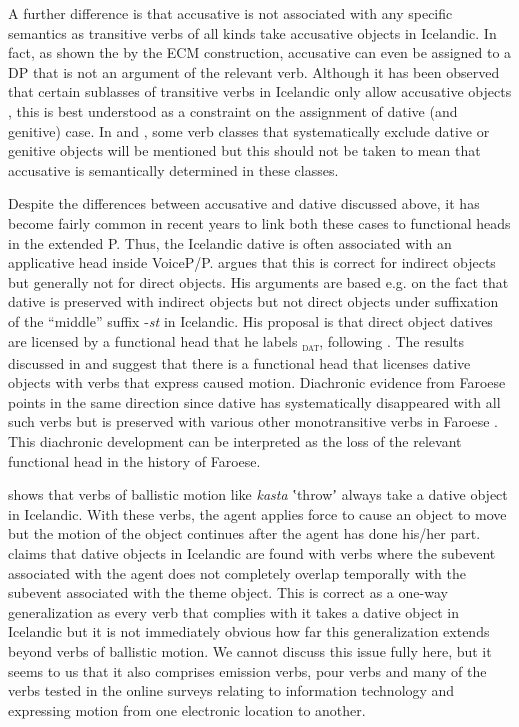 \documentclass[output=paper,modfonts,nonflat,colorlinks,citecolor=brown]{langsci/langscibook}
\begin{document}
A further difference is that accusative is not associated with any specific semantics as transitive verbs of all kinds take accusative objects in Icelandic. In fact, as shown the by the ECM construction, accusative can even be assigned to a DP that is not an argument of the relevant verb. Although it has been observed that certain sublasses of transitive verbs in Icelandic only allow accusative objects \citep{Jónsson2013a}, this is best understood as a constraint on the assignment of dative (and genitive) case. In  and , some verb classes that systematically exclude dative or genitive objects will be mentioned but this should not be taken to mean that accusative is semantically determined in these classes.

Despite the differences between accusative and dative discussed above, it has become fairly common in recent years to link both these cases to functional heads in the extended \liv P. Thus, the Icelandic dative is often associated with an applicative head inside VoiceP/\liv P. \citet[128--138]{Wood2015} argues that this is correct for indirect objects but generally not for direct objects. His arguments are based e.g. on the fact that dative is preserved with indirect objects but not direct objects under suffixation of the “middle” suffix -\textit{st} in Icelandic. His proposal is that direct object datives are licensed by a functional head that he labels \liv\textsc{\textsubscript{dat}}, following \citet{Svenonius2006alternations}. The results discussed in  and  suggest that there is a functional head that licenses dative objects with verbs that express caused motion. Diachronic evidence from Faroese points in the same direction since dative has systematically disappeared with all such verbs but is preserved with various other monotransitive verbs in Faroese \citep{Jónsson2009}. This diachronic development can be interpreted as the loss of the relevant functional head in the history of Faroese.

\citet{Svenonius2002} shows that verbs of ballistic motion like \textit{kasta} ʽthrowʼ always take a dative object in Icelandic. With these verbs, the agent applies force to cause an object to move but the motion of the object continues after the agent has done his/her part. \citet{Svenonius2002} claims that dative objects in Icelandic are found with verbs where the subevent associated with the agent does not completely overlap temporally with the subevent associated with the theme object. This is correct as a one-way generalization as every verb that complies with it takes a dative object in Icelandic but it is not immediately obvious how far this generalization extends beyond verbs of ballistic motion. We cannot discuss this issue fully here, but it seems to us that it also comprises emission verbs, pour verbs and many of the verbs tested in the online surveys relating to information technology and expressing motion from one electronic location to another.
\end{document}
